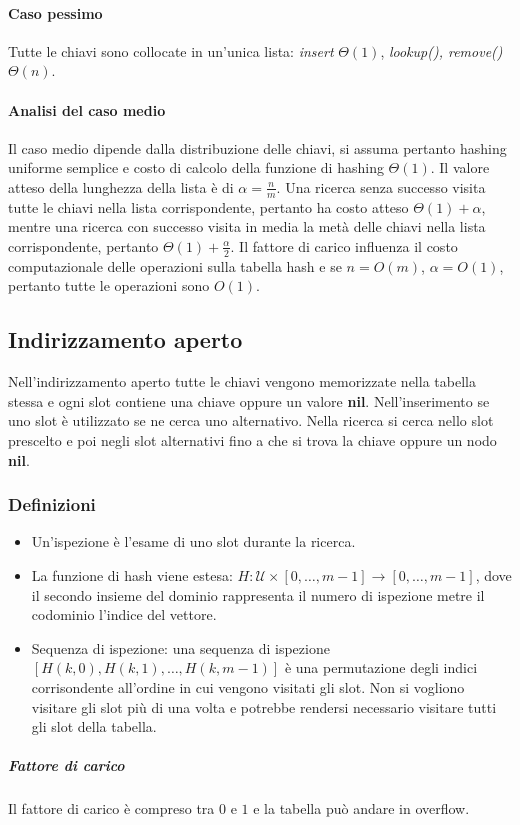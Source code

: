 \paragraph{Caso pessimo}
Tutte le chiavi sono collocate in un'unica lista: \emph{insert{}} $\Theta(1)$, \emph{lookup(), remove()} $\Theta(n)$.
\paragraph{Analisi del caso medio}
Il caso medio dipende dalla distribuzione delle chiavi, si assuma pertanto hashing uniforme semplice e costo di calcolo della funzione di hashing $\Theta(1)
$. Il valore atteso della lunghezza della lista \`e di $\alpha=\frac{n}{m}$. Una ricerca senza successo visita tutte le chiavi nella lista corrispondente, 
pertanto ha costo atteso $\Theta(1)+\alpha$, mentre una ricerca con successo visita in media la met\`a delle chiavi nella lista corrispondente, pertanto
$\Theta(1)+\frac{\alpha}{2}$. Il fattore di carico influenza il costo computazionale delle operazioni sulla tabella hash e se $n=O(m)$, $\alpha=O(1)$, 
pertanto tutte le operazioni sono $O(1)$. 
\subsection{Indirizzamento aperto}
Nell'indirizzamento aperto tutte le chiavi vengono memorizzate nella tabella stessa e ogni slot contiene una chiave oppure un valore \textbf{nil}. 
Nell'inserimento se uno slot \`e utilizzato se ne cerca uno alternativo. Nella ricerca si cerca nello slot prescelto e poi negli slot alternativi fino a 
che si trova la chiave oppure un nodo \textbf{nil}.
\subsubsection{Definizioni}
\begin{itemize}
\item Un'ispezione \`e l'esame di uno slot durante la ricerca.
\item La funzione di hash viene estesa: $H:\mathcal{U}\times[0,\dots, m-1]\rightarrow[0,\dots, m-1]$, dove il secondo insieme del dominio rappresenta il 
numero di ispezione metre il codominio l'indice del vettore. 
\item Sequenza di ispezione: una sequenza di ispezione $[H(k, 0), H(k, 1),\dots, H(k, m-1)]$ \`e una permutazione degli indici corrisondente all'ordine in 
cui vengono visitati gli slot. Non si vogliono visitare gli slot pi\`u di una volta e potrebbe rendersi necessario visitare tutti gli slot della tabella.
\end{itemize}
\subparagraph{Fattore di carico}
Il fattore di carico \`e compreso tra $0$ e $1$ e la tabella pu\`o andare in overflow. 
